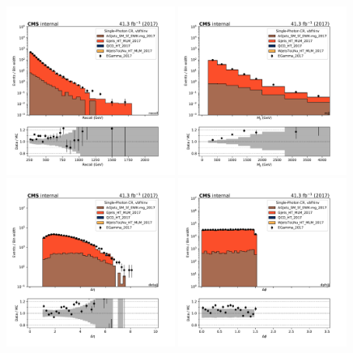 \begin{figure}[htbp]
    \begin{center}
        \includegraphics[width=0.49\textwidth]{fig/datamc/cr_g_vbf/cr_g_vbf_recoil_losf_2017.pdf}
        \includegraphics[width=0.49\textwidth]{fig/datamc/cr_g_vbf/cr_g_vbf_mjj_losf_2017.pdf} \\
        \includegraphics[width=0.49\textwidth]{fig/datamc/cr_g_vbf/cr_g_vbf_detajj_losf_2017.pdf}
        \includegraphics[width=0.49\textwidth]{fig/datamc/cr_g_vbf/cr_g_vbf_dphijj_losf_2017.pdf}

\end{center}
\end{figure}
